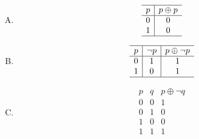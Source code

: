 {{        %
        \begin{practices}
            \begin{enumerate}[A.]
                \item 
                {
                    \begin{table}[H]
                        \[
                            \begin{array}{c|c}
                                \hline
                                p & p \oplus p \\
                                \hline
                                0 & 0 \\
                                1 & 0 \\
                                \hline
                            \end{array}
                        \]
                    \end{table}
                }
                \item 
                {
                    \begin{table}[H]
                        \[
                            \begin{array}{c|c|c}
                                \hline
                                p & \neg p & p \oplus \neg p \\
                                \hline
                                0 & 1 & 1 \\
                                1 & 0 & 1 \\
                                \hline
                            \end{array}
                        \]
                    \end{table}
                }
                \item 
                {
                    \begin{table}[H]
                        \[
                            \begin{array}{c|c|c}
                                \hline
                                p & q & p \oplus \neg q \\
                                \hline
                                0 & 0 & 1 \\
                                0 & 1 & 0 \\
                                1 & 0 & 0 \\
                                1 & 1 & 1 \\

\end{array}\]
\end{table}}
\end{enumerate}
\end{practices}}}
